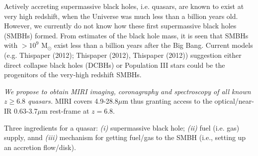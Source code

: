 \documentclass[12pt]{article}
\newcommand{\mgii}{Mg\,{\sc ii}\ }
\begin{document}
%
%
\justification          %
%
%
%

Actively accreting supermassive black holes, i.e. quasars, are known to exist at very high redshift, when the Universe was
much less than a billion years old. 
However, we currently do not know how these first supermassive black holes (SMBHs) formed.
From estimates of the black hole mass, it is seen that SMBHs with $>10^{9}$ M$_{\odot}$ exist less than a billion years after the Big Bang.
Current models (e.g. Thispaper (2012); Thispaper (2012), Thispaper (2012)) suggestion either
direct collapse black holes (DCBHs) or Population {\sc III} stars could be the progenitors of the very-high redshift SMBHs. 

{\it We propose to obtain MIRI imaging, coronagraphy and spectroscopy of all known $z \geq 6.8$ quasars.} 
MIRI covers 4.9-28.8$\mu$m thus granting access to the optical/near-IR  0.63-3.7$\mu$m rest-frame at $z=6.8$.


Three ingredients for a quasar: 
{\it (i)} supermassive black hole;  
{\it (ii)} fuel (i.e. gas) supply, annd 
 {\it (iii)} mechanism for getting fuel/gas to the SMBH (i.e., setting up an accretion flow/disk). 
\end{document}
